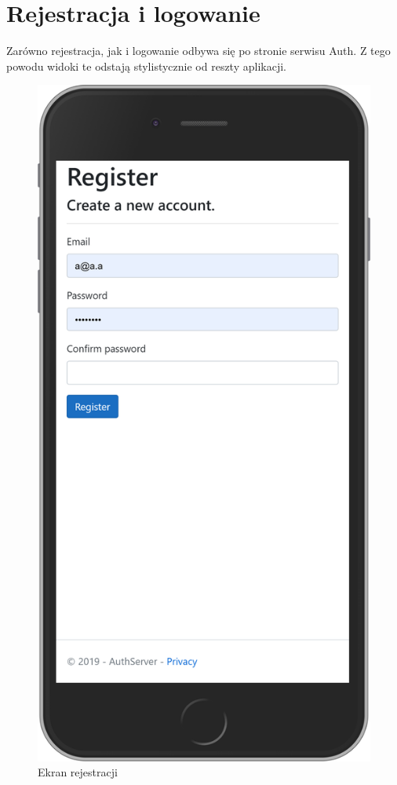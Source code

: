\section{Rejestracja i logowanie}
	Zarówno rejestracja, jak i logowanie odbywa się po stronie serwisu Auth.
	Z tego powodu widoki te odstają stylistycznie od reszty aplikacji.
	\begin{figure}[H]
		\centering
		\begin{minipage}{.5\textwidth}
			\centering
			\includegraphics[width=0.75\linewidth]{rys07/register.png}
			\caption{Ekran rejestracji}
		\end{minipage}%
		\begin{minipage}{0.5\textwidth}
			\centering

\end{minipage}
\end{figure}
